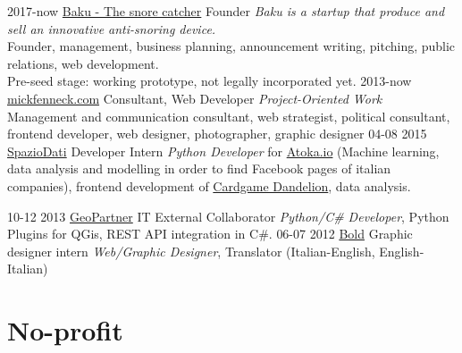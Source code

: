 \documentclass[]{friggeri-cv}
\begin{document}
\begin{entrylist}
\entry
    {2017-now}
    {\href{http://snorecatcher.it/it/benvenuti.html}{Baku - The snore catcher}}
    {Founder}
    {\emph{Baku is a startup that produce and sell an innovative anti-snoring device.}\\
    {Founder, management, business planning, announcement writing, pitching, public relations, web development.\\
    Pre-seed stage: working prototype, not legally incorporated yet.}
    }
\entry
    {2013-now}
    {\href{http://www.mickfenneck.com}{mickfenneck.com}}
    {Consultant, Web Developer}
    {\emph{Project-Oriented Work}\\
    {Management and communication consultant, web strategist, political consultant, frontend developer, web designer, photographer, graphic designer}
    }
\entry
    {04-08 2015}
    {\href{https://spaziodati.eu/en/}{SpazioDati}}
    {Developer Intern}
    {\emph{Python Developer} for \href{https://atoka.io/en/}{Atoka.io} (Machine learning, data analysis and modelling in order to find Facebook pages of italian companies), frontend development of \href{http://cardgame.dandelion.eu}{Cardgame Dandelion}, data analysis.
    }
\end{entrylist}
\begin{entrylist}
\entry
    {10-12 2013}
    {\href{http://www.geopartner.it}{GeoPartner}}
    {IT External Collaborator}
    {\emph{Python/C\# Developer}, Python Plugins for QGis, REST API integration in C\#.
    }
\entry
    {06-07 2012}
    {\href{http://www.studiobold.it}{Bold}}
    {Graphic designer intern}
    {\emph{Web/Graphic Designer}, Translator (Italian-English, English-Italian)}
\end{entrylist}



\section{No-profit}
\end{document}

